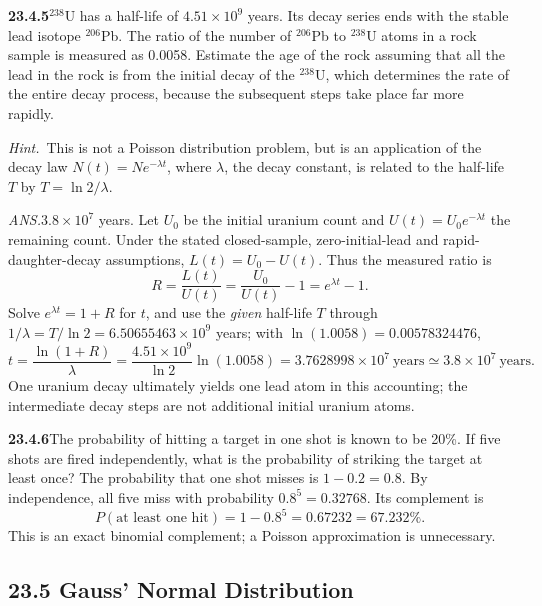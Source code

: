 \par\bigskip
\noindent\textbf{23.4.5}\quad $^{238}$U has a half-life of
$4.51\times10^{9}$ years. Its decay series ends with the stable
lead isotope $^{206}$Pb. The ratio of the number of $^{206}$Pb to
$^{238}$U atoms in a rock sample is measured as 0.0058. Estimate
the age of the rock assuming that all the lead in the rock is
from the initial decay of the $^{238}$U, which determines the
rate of the entire decay process, because the subsequent steps
take place far more rapidly.
\par\emph{Hint.}~This is not a Poisson distribution problem,
but is an application of the decay law $N(t)=Ne^{-\lambda t}$,
where $\lambda$, the decay constant, is related to the half-life
$T$ by $T=\ln 2/\lambda$.
\par\nobreak\hfill\emph{ANS.}\enspace $3.8\times10^{7}$ years.
\solution
Let $U_0$ be the initial uranium count and $U(t)=U_0e^{-\lambda t}$
the remaining count. Under the stated closed-sample, zero-initial-lead
and rapid-daughter-decay assumptions, $L(t)=U_0-U(t)$.
Thus the measured ratio is
\[
R=\frac{L(t)}{U(t)}=\frac{U_0}{U(t)}-1=e^{\lambda t}-1.
\]
Solve $e^{\lambda t}=1+R$ for $t$, and use the \emph{given} half-life
$T$ through $1/\lambda=T/\ln2=6.50655463\times10^9$ years; with
$\ln(1.0058)=0.00578324476$,
\[
\boxed{t=\frac{\ln(1+R)}\lambda
=\frac{4.51\times10^9}{\ln2}\ln(1.0058)
=3.7628998\times10^7\ \text{years}
\simeq3.8\times10^7\ \text{years}}.
\]
One uranium decay ultimately yields one lead atom in this accounting;
the intermediate decay steps are not additional initial uranium atoms.


\par\bigskip
\noindent\textbf{23.4.6}\quad The probability of hitting a target
in one shot is known to be 20\%. If five shots are fired
independently, what is the probability of striking the target at
least once?
\solution
The probability that one shot misses is $1-0.2=0.8$. By independence,
all five miss with probability $0.8^5=0.32768$. Its complement is
\[
\boxed{P(\text{at least one hit})=1-0.8^5=0.67232=67.232\%}.
\]
This is an exact binomial complement; a Poisson approximation is unnecessary.


\subsection*{23.5 Gauss' Normal Distribution}

